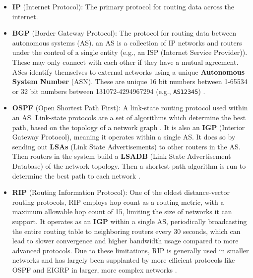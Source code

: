 \begin{Def}
    
    \begin{itemize}
        \item \textbf{IP} (Internet Protocol): The primary protocol for routing data across the internet.
        \item \textbf{BGP} (Border Gateway Protocol): The protocol for routing data between autonomous systems (AS). 
        an AS is a collection of IP networks and routers under the control of a single entity (e.g., an ISP (Internet Service Provider)).
        These may only connect with each other if they have a mutual agreement. ASes identify themselves to 
        external networks using a unique \textbf{Autonomous System Number} (ASN).
        These are unique 16 bit numbers between 1-65534 or 32 bit numbers between 131072-4294967294 (e.g., \texttt{AS12345}) \cite{cloudflare_autonomous_system}.
        \item \textbf{OSPF} (Open Shortest Path First): A link-state routing protocol used within an AS. Link-state protocols are a set 
        of algorithms which determine the best path, based on the topology of a network graph \cite{kurose_link_state_routing}.
        It is also an \textbf{IGP} (Interior Gateway Protocol), meaning it operates within a single AS. It does so by sending out \textbf{LSAs} (Link State Advertisements) to other routers in the AS.
        Then routers in the system build a \textbf{LSADB} (Link State Advertisement Database) of the network topology. Then a shortest path algorithm is run to determine the best path to each network \cite{certbros_ospf_explained}.
        \item \textbf{RIP} (Routing Information Protocol): One of the oldest distance-vector routing protocols, RIP employs hop count as a routing metric, with a maximum allowable hop count of 15, limiting the size of networks it can support.
        It operates as an \textbf{IGP} within a single AS, periodically broadcasting the entire routing table to neighboring routers every 30 seconds,
        which can lead to slower convergence and higher bandwidth usage compared to more advanced protocols.
        Due to these limitations, RIP is generally used in smaller networks and has largely been supplanted by more efficient protocols like OSPF and EIGRP in larger, more complex networks \cite{javatpoint_rip_protocol}.
    \end{itemize}
\end{Def}

